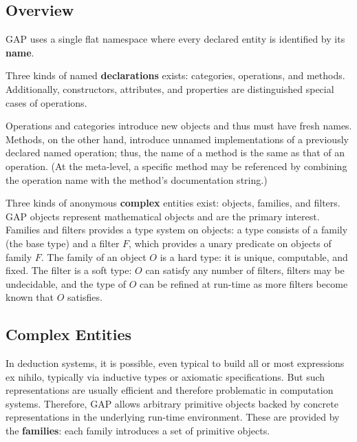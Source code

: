\subsection{Overview}

GAP uses a single flat namespace where every declared entity is identified by its \textbf{name}.

Three kinds of named \textbf{declarations} exists: categories, operations, and methods.
Additionally, constructors, attributes, and properties are distinguished special cases of operations.

Operations and categories introduce new objects and thus must have fresh names.
Methods, on the other hand, introduce unnamed implementations of a previously declared named operation; thus, the name of a method is the same as that of an operation.
(At the meta-level, a specific method may be referenced by combining the operation name with the method's documentation string.)

Three kinds of anonymous \textbf{complex} entities exist: objects, families, and filters.
GAP objects represent mathematical objects and are the primary interest.
Families and filters provides a type system on objects: a type consists of a family (the base type) and a filter $F$, which provides a unary predicate on objects of family $F$.
The family of an object $O$ is a hard type: it is unique, computable, and fixed.
The filter is a soft type: $O$ can satisfy any number of filters, filters may be undecidable, and the type of $O$ can be refined at run-time as more filters become known that $O$ satisfies.

\subsection{Complex Entities}

In deduction systems, it is possible, even typical to build all or most expressions ex nihilo, typically via inductive types or axiomatic specifications.
But such representations are usually efficient and therefore problematic in computation systems.
Therefore, GAP allows arbitrary primitive objects backed by concrete representations in the underlying run-time environment.
These are provided by the \textbf{families}: each family introduces a set of primitive objects.

